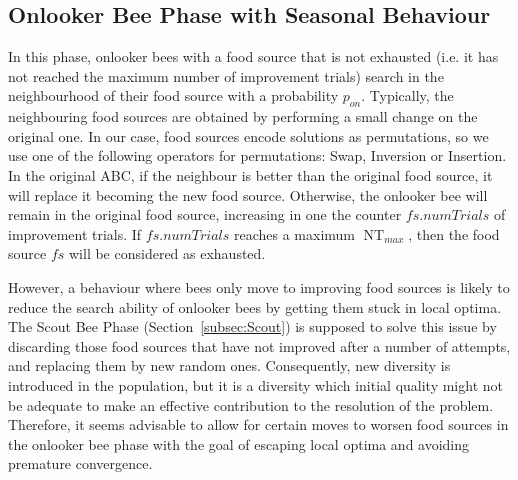 \documentclass[icae]{iosart2x}
\newcommand{\reviewed}[1]{#1} %
\begin{document}
\subsection{Onlooker Bee Phase with Seasonal Behaviour}
\reviewed{In this phase, onlooker bees with a food source that is not exhausted (i.e. it has not reached the maximum number of improvement trials) search in the neighbourhood of their food source with a probability $p_{on}$.} \reviewed{Typically, the neighbouring food sources} are obtained by performing a small change on the original one. \reviewed{In our case, food sources encode solutions as permutations, so we use} one of the following operators for permutations: Swap, Inversion or Insertion. In the original ABC, if the neighbour is better than the original food source, it will replace it becoming the new food source. Otherwise, the onlooker bee will remain in the original food source, increasing in one the counter $\textit{fs.numTrials}$ of improvement trials. If $\textit{fs.numTrials}$ reaches a maximum $\operatorname{NT}_{max}$, then the food source $\textit{fs}$ will be considered as exhausted.

However, a behaviour where bees only move to improving food sources is likely to reduce the search ability of onlooker bees by getting them stuck \reviewed{in local optima}. The Scout Bee Phase (Section~\ref{subsec:Scout}) is supposed to solve this issue by discarding those food sources that have not improved after a number of attempts, and replacing them by \reviewed{new} random ones. Consequently, new diversity is introduced in the population, but it is a diversity which initial quality might not be adequate to make an effective contribution to the resolution of the problem. Therefore, it seems advisable to allow for certain moves to worsen food sources in the onlooker bee phase with the goal of escaping local optima and avoiding premature convergence.
\end{document}
